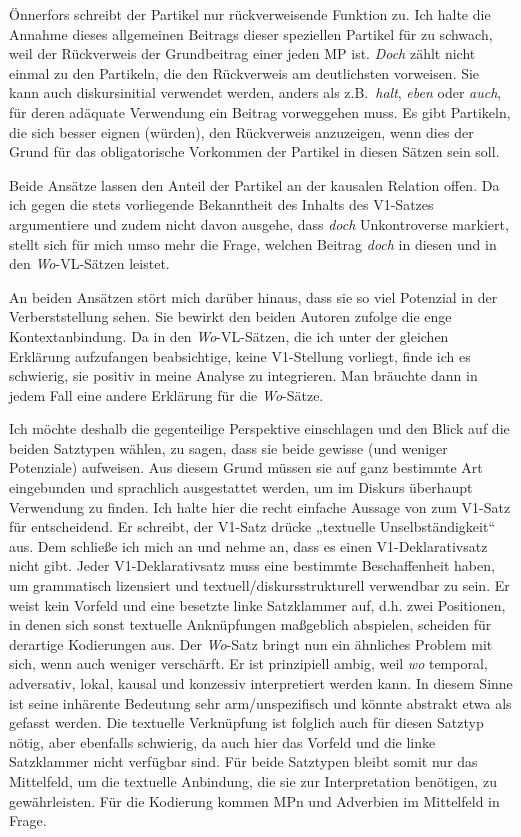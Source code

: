 Önnerfors schreibt der Partikel nur rückverweisende Funktion zu. Ich halte die Annahme dieses allgemeinen Beitrags dieser speziellen Partikel für zu schwach, weil der Rückverweis der Grundbeitrag einer jeden MP ist. \textit{Doch} zählt nicht einmal zu den Partikeln, die den Rückverweis am deutlichsten vorweisen. Sie kann auch diskursinitial verwendet werden, anders als z.B.\ \textit{halt}, \textit{eben} oder \textit{auch}, für deren adäquate Verwendung ein Beitrag vorweggehen muss. Es gibt Partikeln, die sich besser eignen (würden), den Rückverweis anzuzeigen, wenn dies der Grund für das obligatorische Vorkommen der Partikel in diesen Sätzen sein soll.

Beide Ansätze lassen den Anteil der Partikel an der kausalen Relation offen. Da ich gegen die stets vorliegende Bekanntheit des Inhalts des V1-Satzes argumentiere und zudem nicht davon ausgehe, dass \textit{doch} Unkontroverse markiert, stellt sich für mich umso mehr die Frage, welchen Beitrag \textit{doch} in diesen und in den \textit{Wo}-VL-Sätzen leistet. 

An beiden Ansätzen stört mich darüber hinaus, dass sie so viel Potenzial in der Verberststellung sehen. Sie bewirkt den beiden Autoren zufolge die enge Kontextanbindung. Da in den \textit{Wo}-VL-Sätzen, die ich unter der gleichen Erklärung aufzufangen beabsichtige, keine V1-Stellung vorliegt, finde ich es schwierig, sie positiv in meine Analyse zu integrieren. Man bräuchte dann in jedem Fall eine andere Erklärung für die \textit{Wo}-Sätze.

Ich möchte deshalb die gegenteilige Perspektive einschlagen und den Blick auf die beiden Satztypen wählen, zu sagen, dass sie beide gewisse  (und weniger Potenziale) aufweisen. Aus diesem Grund müssen sie auf ganz be\-stimmte Art eingebunden und sprachlich ausgestattet werden, um im Diskurs überhaupt Verwendung zu finden. Ich halte hier die recht einfache Aussage von \citet[250]{Scheutz2009} zum V1-Satz für entscheidend. Er schreibt, der V1-Satz drücke „textuelle Unselbständigkeit“ aus. Dem schließe ich mich an und nehme an, dass es einen  V1-Deklarativsatz nicht gibt. Jeder V1-Deklarativsatz  muss eine bestimmte Beschaffenheit haben, um grammatisch lizensiert und textuell/diskurs\-strukturell verwendbar zu sein. Er weist kein Vorfeld und eine besetzte linke Satzklammer auf, d.h. zwei Positionen, in denen sich sonst textuelle Anknüpfungen maßgeblich abspielen, scheiden für derartige Kodierungen aus. Der \textit{Wo}-Satz bringt nun ein ähnliches Problem mit sich, wenn auch weniger verschärft. Er ist prinzipiell ambig, weil \textit{wo} temporal, adversativ, lokal, kausal und konzessiv interpretiert werden kann. In diesem Sinne ist seine inhärente Bedeutung sehr arm\slash unspezifisch und könnte abstrakt etwa als  gefasst werden. Die textuelle Verknüpfung ist folglich auch für diesen Satztyp nötig, aber ebenfalls schwierig, da auch hier das Vorfeld und die linke Satzklammer nicht verfügbar sind. Für beide Satztypen bleibt somit nur das Mittelfeld, um die textuelle Anbindung, die sie zur Interpretation benötigen, zu gewährleisten. Für die Kodierung kommen MPn und Adverbien im Mittelfeld in Frage.

